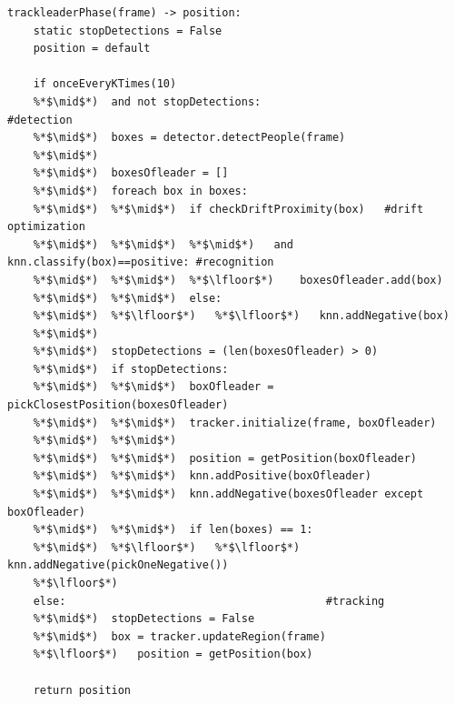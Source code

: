 \begin{lstlisting}[captionpos=b, 
	caption={It is the pseudocode of the second phase. The function \textit{track leader} alternatively runs the detection and tracking modules to constantly know the position of the leader.}, 
	label=alg:trackleaderPhase
	]
trackleaderPhase(frame) -> position:
	static stopDetections = False
	position = default
	
	if onceEveryKTimes(10) 
	%*$\mid$*)  and not stopDetections: 					 #detection
	%*$\mid$*)	boxes = detector.detectPeople(frame)
	%*$\mid$*)	
	%*$\mid$*)	boxesOfleader = []
	%*$\mid$*)	foreach box in boxes:
	%*$\mid$*)	%*$\mid$*)	if checkDriftProximity(box)	  #drift optimization
	%*$\mid$*)	%*$\mid$*)	%*$\mid$*)   and knn.classify(box)==positive: #recognition
	%*$\mid$*)	%*$\mid$*)	%*$\lfloor$*)	 boxesOfleader.add(box)
	%*$\mid$*)	%*$\mid$*)	else:
	%*$\mid$*)	%*$\lfloor$*)	%*$\lfloor$*)	knn.addNegative(box)
	%*$\mid$*)			
	%*$\mid$*)	stopDetections = (len(boxesOfleader) > 0)
	%*$\mid$*)	if stopDetections:
	%*$\mid$*)	%*$\mid$*)	boxOfleader = pickClosestPosition(boxesOfleader) 
	%*$\mid$*)	%*$\mid$*)	tracker.initialize(frame, boxOfleader)
	%*$\mid$*)	%*$\mid$*)	
	%*$\mid$*)	%*$\mid$*)	position = getPosition(boxOfleader)
	%*$\mid$*)	%*$\mid$*)	knn.addPositive(boxOfleader)			 
	%*$\mid$*)	%*$\mid$*)	knn.addNegative(boxesOfleader except boxOfleader)
	%*$\mid$*)	%*$\mid$*)	if len(boxes) == 1:
	%*$\mid$*)	%*$\lfloor$*)	%*$\lfloor$*)	knn.addNegative(pickOneNegative())
	%*$\lfloor$*)		
	else: 										 #tracking
	%*$\mid$*)	stopDetections = False
	%*$\mid$*)	box = tracker.updateRegion(frame)
	%*$\lfloor$*)	position = getPosition(box)
	
	return position
\end{lstlisting}
